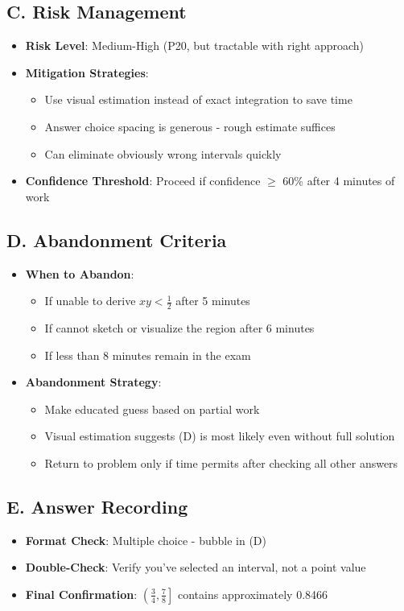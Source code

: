 \documentclass[11pt]{article}
\begin{document}
\begin{competitionbox}
\subsection*{C. Risk Management}
\begin{itemize}[leftmargin=*]
    \item \textbf{Risk Level}: Medium-High (P20, but tractable with right approach)
    \item \textbf{Mitigation Strategies}:
    \begin{itemize}
        \item Use visual estimation instead of exact integration to save time
        \item Answer choice spacing is generous - rough estimate suffices
        \item Can eliminate obviously wrong intervals quickly
    \end{itemize}
    \item \textbf{Confidence Threshold}: Proceed if confidence $\geq$ 60\% after 4 minutes of work
\end{itemize}

\subsection*{D. Abandonment Criteria}
\begin{itemize}[leftmargin=*]
    \item \textbf{When to Abandon}:
    \begin{itemize}
        \item If unable to derive $xy < \frac{1}{2}$ after 5 minutes
        \item If cannot sketch or visualize the region after 6 minutes
        \item If less than 8 minutes remain in the exam
    \end{itemize}
    \item \textbf{Abandonment Strategy}:
    \begin{itemize}
        \item Make educated guess based on partial work
        \item Visual estimation suggests (D) is most likely even without full solution
        \item Return to problem only if time permits after checking all other answers
    \end{itemize}
\end{itemize}

\subsection*{E. Answer Recording}
\begin{itemize}[leftmargin=*]
    \item \textbf{Format Check}: Multiple choice - bubble in (D)
    \item \textbf{Double-Check}: Verify you've selected an interval, not a point value
    \item \textbf{Final Confirmation}: $\left(\frac{3}{4}, \frac{7}{8}\right]$ contains approximately 0.8466
\end{itemize}
\end{competitionbox}
\end{document}
